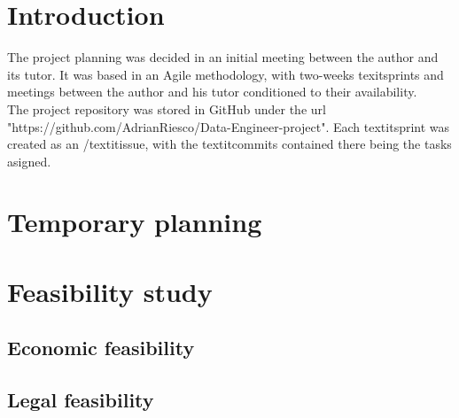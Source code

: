 
\section{Introduction}
\nonzeroparskip The project planning was decided in an initial meeting between the author and its tutor. It was based in an Agile methodology, with two-weeks texit{sprints} and meetings between the author and his tutor conditioned to their availability.
\\
\nonzeroparskip The project repository was stored in GitHub under the url "https://github.com/AdrianRiesco/Data-Engineer-project". Each textit{sprint} was created as an /textit{issue}, with the textit{commits} contained there being the tasks asigned.

\section{Temporary planning}

\section{Feasibility study}

\subsection{Economic feasibility}

\subsection{Legal feasibility}


